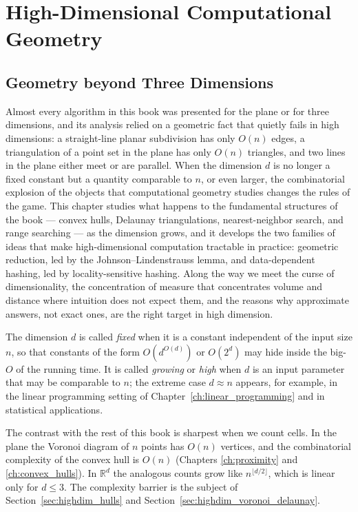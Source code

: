 \chapter{High-Dimensional Computational Geometry}
\label{ch:high_dimensional}

\section{Geometry beyond Three Dimensions}
\label{sec:highdim_intro}

Almost every algorithm in this book was presented for the plane or for three
dimensions, and its analysis relied on a geometric fact that quietly fails in
high dimensions: a straight-line planar subdivision has only $O(n)$ edges, a
triangulation of a point set in the plane has only $O(n)$ triangles, and two
lines in the plane either meet or are parallel. When the dimension $d$ is no
longer a fixed constant but a quantity comparable to $n$, or even larger, the
combinatorial explosion of the objects that computational geometry studies
changes the rules of the game. This chapter studies what happens to the
fundamental structures of the book --- convex hulls, Delaunay triangulations,
nearest-neighbor search, and range searching --- as the dimension grows, and it
develops the two families of ideas that make high-dimensional computation
tractable in practice: geometric reduction, led by the
Johnson--Lindenstrauss lemma, and data-dependent hashing, led by
locality-sensitive hashing. Along the way we meet the
curse of dimensionality, the concentration of
measure that concentrates volume and distance where intuition does not expect
them, and the reasons why approximate answers, not exact ones, are the right
target in high dimension.

\begin{definition}
\label{def:highdim_regime}
The dimension $d$ is called
\emph{fixed} when it is a constant independent of the
input size $n$, so that constants of the form $O(d^{O(d)})$ or $O(2^d)$ may
hide inside the big-$O$ of the running time. It is called \emph{growing} or
\emph{high} when $d$ is an input parameter that may be comparable to $n$; the
extreme case $d \approx n$ appears, for example, in the linear programming
setting of Chapter~\ref{ch:linear_programming} and in statistical
applications.
\end{definition}

The contrast with the rest of this book is sharpest when we count cells. In
the plane the Voronoi diagram of $n$ points has $O(n)$ vertices, and the
combinatorial complexity of the convex hull is $O(n)$ (Chapters
\ref{ch:proximity} and \ref{ch:convex_hulls}). In $\mathbb{R}^d$ the analogous
counts grow like $n^{\lfloor d/2 \rfloor}$, which is linear only for $d \le 3$.
The complexity barrier is the subject of Section~\ref{sec:highdim_hulls} and
Section~\ref{sec:highdim_voronoi_delaunay}.

